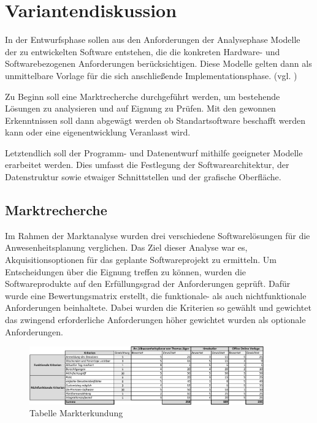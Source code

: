 \section{Variantendiskussion}
\label{sec:Variantendiskussion}
In der Entwurfsphase sollen aus den Anforderungen der Analysephase Modelle der zu entwickelten Software entstehen, die die konkreten Hardware- und Softwarebezogenen Anforderungen berücksichtigen. Diese Modelle gelten dann als unmittelbare Vorlage für die sich anschließende Implementationsphase. (vgl. \cite[S. 69]{dumke-2003})

Zu Beginn soll eine Marktrecherche durchgeführt werden, um bestehende Lösungen zu analysieren und auf Eignung zu Prüfen. Mit den gewonnen Erkenntnissen soll dann abgewägt werden ob Standartsoftware beschafft werden kann oder eine eigenentwicklung Veranlasst wird.

Letztendlich soll der Programm- und Datenentwurf mithilfe geeigneter Modelle erarbeitet werden. Dies umfasst die Festlegung der Softwarearchitektur, der Datenstruktur sowie etwaiger Schnittstellen und der grafische Oberfläche.

\subsection{Marktrecherche}
\label{sec:Marktrecherche}
Im Rahmen der Marktanalyse wurden drei verschiedene Softwarelösungen für die Anwesenheitsplanung verglichen. Das Ziel dieser Analyse war es, Akquisitionsoptionen für das geplante Softwareprojekt zu ermitteln. Um Entscheidungen über die Eignung treffen zu können, wurden die Softwareprodukte auf den Erfüllungsgrad der Anforderungen geprüft. Dafür wurde eine Bewertungsmatrix erstellt, die funktionale- als auch nichtfunktionale Anforderungen beinhaltete. Dabei wurden die Kriterien so gewählt und gewichtet das zwingend erforderliche Anforderungen höher gewichtet wurden als optionale Anforderungen.

\begin{figure}[htb]
    \centering
    \includegraphics[width=0.9\textwidth,angle=0]{abb/Markterkundung.pdf}
    \caption[Beschreibung]{ Tabelle Markterkundung}
    \label{tab:Markterkundung}
\end{figure}

